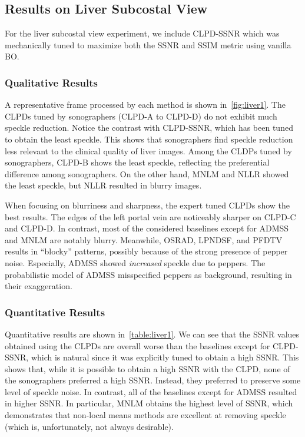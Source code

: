 \subsection{Results on Liver Subcostal View}
For the liver subcostal view experiment, we include CLPD-SSNR which was mechanically tuned to maximize both the SSNR and SSIM metric using vanilla BO.

\subsubsection{Qualitative Results}
A representative frame processed by each method is shown in~\cref{fig:liver1}.
The CLPDs tuned by sonographers (CLPD-A to CLPD-D) do not exhibit much speckle reduction.
Notice the contrast with CLPD-SSNR, which has been tuned to obtain the least speckle.
This shows that sonographers find speckle reduction less relevant to the clinical quality of liver images.
Among the CLDPs tuned by sonographers, CLPD-B shows the least speckle, reflecting the preferential difference among sonographers.
On the other hand, MNLM and NLLR showed the least speckle, but NLLR resulted in blurry images.

When focusing on blurriness and sharpness, the expert tuned CLPDs show the best results.
The edges of the left portal vein are noticeably sharper on CLPD-C and CLPD-D.
In contrast, most of the considered baselines except for ADMSS and MNLM are notably blurry.
Meanwhile, OSRAD, LPNDSF, and PFDTV results in ``blocky'' patterns, possibly because of the strong presence of pepper noise. 
Especially, ADMSS showed \textit{increased} speckle due to peppers.
The probabilistic model of ADMSS misspecified peppers as background, resulting in their exaggeration.


%
\subsubsection{Quantitative Results}
Quantitative results are shown in~\cref{table:liver1}.
We can see that the SSNR values obtained using the CLPDs are overall worse than the baselines except for CLPD-SSNR, which is natural since it was explicitly tuned to obtain a high SSNR.
This shows that, while it is possible to obtain a high SSNR with the CLPD, none of the sonographers preferred a high SSNR.
Instead, they preferred to preserve some level of speckle noise.
In contrast, all of the baselines except for ADMSS resulted in higher SSNR.
In particular, MNLM obtains the highest level of SSNR, which demonstrates that non-local means methods are excellent at removing speckle (which is, unfortunately, not always desirable).

